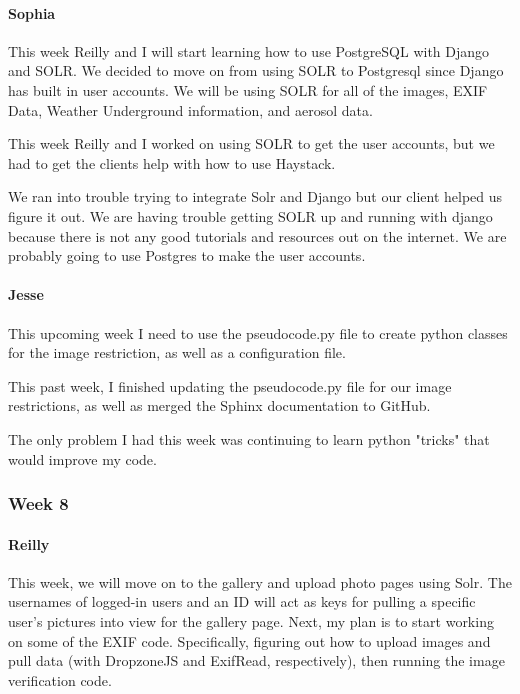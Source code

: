 \documentclass[onecolumn, draftclsnofoot,10pt, compsoc]{IEEEtran}
\begin{document}
\begin{flushleft}
\paragraph{Sophia}
 
This week Reilly and I will start learning how to use PostgreSQL with Django and SOLR. We decided to move on from using SOLR to Postgresql since Django has built in user accounts. We will be using SOLR for all of the images, EXIF Data, Weather Underground information, and aerosol data.
 
 
This week Reilly and I worked on using SOLR to get the user accounts, but we had to get the clients help with how to use Haystack.
 
 
We ran into trouble trying to integrate Solr and Django but our client helped us figure it out. We are having trouble getting SOLR up and running with django because there is not any good tutorials and resources out on the internet. We are probably going to use Postgres to make the user accounts.
 
\paragraph{Jesse}
 
This upcoming week I need to use the pseudocode.py file to create python classes for the image restriction, as well as a configuration file.
 
 
This past week, I finished updating the pseudocode.py file for our image restrictions, as well as merged the Sphinx documentation to GitHub.
 
 
The only problem I had this week was continuing to learn python "tricks" that would improve my code.
 
\subsubsection{Week 8}
\paragraph{Reilly}
 
This week, we will move on to the gallery and upload photo pages using Solr. The usernames of logged-in users and an ID will act as keys for pulling a specific user's pictures into view for the gallery page. Next, my plan is to start working on some of the EXIF code. Specifically, figuring out how to upload images and pull data (with DropzoneJS and ExifRead, respectively), then running the image verification code.
 

\end{flushleft}
\end{document}
